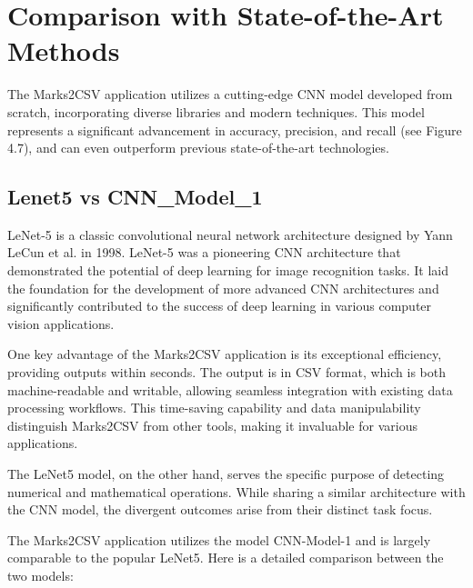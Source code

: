 \section{Comparison with State-of-the-Art Methods}


The Marks2CSV application utilizes a cutting-edge CNN model developed from scratch, incorporating diverse libraries and modern techniques. This model represents a significant advancement in accuracy, precision, and recall (see Figure 4.7), and can even outperform previous state-of-the-art technologies.

\subsection{Lenet5 vs CNN\_Model\_1}

LeNet-5 is a classic convolutional neural network architecture designed by Yann LeCun et al. in 1998. LeNet-5 was a pioneering CNN architecture that demonstrated the potential of deep learning for image recognition tasks. It laid the foundation for the development of more advanced CNN architectures and significantly contributed to the success of deep learning in various computer vision applications.

\noindent One key advantage of the Marks2CSV application is its exceptional efficiency, providing outputs within seconds. The output is in CSV format, which is both machine-readable and writable, allowing seamless integration with existing data processing workflows. This time-saving capability and data manipulability distinguish Marks2CSV from other tools, making it invaluable for various applications.

\noindent The LeNet5 model, on the other hand, serves the specific purpose of detecting numerical and mathematical operations. While sharing a similar architecture with the CNN model, the divergent outcomes arise from their distinct task focus.

\noindent The Marks2CSV application utilizes the model CNN-Model-1 and is largely comparable to the popular LeNet5. Here is a detailed comparison between the two models:\\


